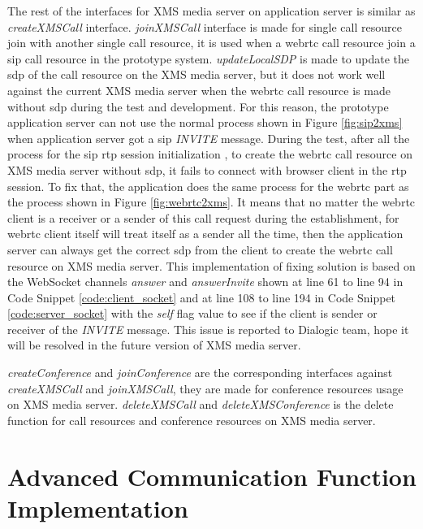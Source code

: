 \par The rest of the interfaces for XMS media server on application server is similar as \textit{createXMSCall} interface. \textit{joinXMSCall} interface is made for single call resource join with another single call resource, it is used when a \gls{webrtc} call resource join a \gls{sip} call resource in the prototype system. \textit{updateLocalSDP} is made to update the \gls{sdp} of the call resource on the XMS media server, but it does not work well against the current XMS media server when the \gls{webrtc} call resource is made without \gls{sdp} during the test and development. For this reason, the prototype application server can not use the normal process shown in Figure \ref{fig:sip2xms} when application server got a \gls{sip} \textit{INVITE} message. During the test, after all the process for the \gls{sip} \gls{rtp} session initialization , to create the \gls{webrtc} call resource on XMS media server without \gls{sdp}, it fails to connect with browser client in the \gls{rtp} session. To fix that, the application does the same process for the \gls{webrtc} part as the process shown in Figure \ref{fig:webrtc2xms}. It means that no matter the \gls{webrtc} client is a receiver or a sender of this call request during the establishment, for \gls{webrtc} client itself will treat itself as a sender all the time, then the application server can always get the correct \gls{sdp} from the client to create the \gls{webrtc} call resource on XMS media server. This implementation of fixing solution is based on the WebSocket channels \textit{answer} and \textit{answerInvite} shown at line 61 to line 94 in Code Snippet \ref{code:client_socket} and at line 108 to line 194 in Code Snippet \ref{code:server_socket} with the \textit{self} flag value to see if the client is sender or receiver of the \textit{INVITE} message. This issue is reported to Dialogic team, hope it will be resolved in the future version of XMS media server.

\par \textit{createConference} and \textit{joinConference} are the corresponding interfaces against \textit{createXMSCall} and \textit{joinXMSCall}, they are made for conference resources usage on XMS media server. \textit{deleteXMSCall} and \textit{deleteXMSConference} is the delete function for call resources and conference resources on XMS media server.

\section{Advanced Communication Function Implementation}

